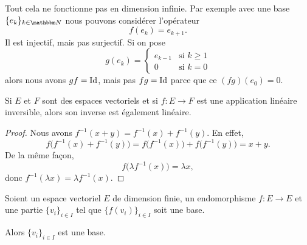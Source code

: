 \begin{example}
    Tout cela ne fonctionne pas en dimension infinie. Par exemple avec une base \( \{ e_k \}_{k\in \eN}\) nous pouvons considérer l'opérateur
    \begin{equation}
        f(e_k)=e_{k+1}.
    \end{equation}
    Il est injectif, mais pas surjectif. Si on pose
    \begin{equation}
        g(e_k)=\begin{cases}
            e_{k-1}    &   \text{si } k\geq 1\\
            0    &    \text{si } k=0
        \end{cases}
    \end{equation}
    alors nous avons \( gf=\operatorname{Id}\), mais pas \( fg=\operatorname{Id}\) parce que ce \( (fg)(e_0)=0\).
\end{example}

\begin{lemma}       \label{LEMooRZDTooEuLTrO}
    Si \( E\) et \( F\) sont des espaces vectoriels et si \( f\colon E\to F\) est une application linéaire inversible, alors son inverse est également linéaire.
\end{lemma}

\begin{proof}
    Nous avons \( f^{-1}(x+y)=f^{-1}(x)+f^{-1}(y)\). En effet,
    \begin{equation}
        f\big( f^{-1}(x)+f^{-1}(y) \big)=f\big( f^{-1}(x) \big)+f\big( f^{-1}(y) \big)=x+y.
    \end{equation}
    De la même façon,
    \begin{equation}
        f\big( \lambda f^{-1}(x) \big)=\lambda x, 
    \end{equation}
    donc \( f^{-1}(\lambda x)=\lambda f^{-1}(x)\).
\end{proof}

\begin{proposition}     \label{PROPooHLUYooNsDgbn}
    Soient un espace vectoriel \( E\) de dimension finie, un endomorphisme \( f\colon E\to E\) et une partie \( \{v_i\}_{i\in I}\) tel que \( \{f(v_i)\}_{i\in I}\) soit une base.

    Alors \( \{v_i\}_{i\in I}\) est une base.
\end{proposition}


